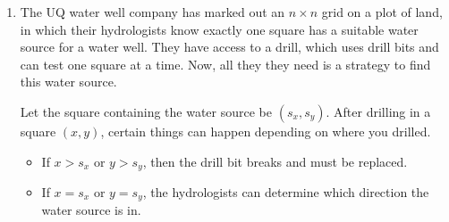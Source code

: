 \documentclass[a4,13pt]{extarticle}
\newenvironment{Solution}{\color{blue}\textbf{Solution:}}{}
\begin{document}
\begin{enumerate}
\begin{enumerate}
	      	\item (1 mark) Using the bound found above, evaluate the overall memory efficiency of your implementation. 
	      	      You should especially consider the case where your plane is very large but has very few elements.
	      	
	      	\begin{Solution}
	      	\end{Solution}
	      	      	      	                      
	      	\item (3 marks) State (using Big-O notation) the time complexity of the following methods:
	      	      	      	                      
	      	      \begin{itemize}
	      	      	\item \texttt{add}
	      	      	\item \texttt{get}
	      	      	\item \texttt{remove}
	      	      	\item \texttt{resize}
	      	      	\item \texttt{clear}
	      	      \end{itemize}
	      	      	      	                      
	      	      Ensure you define all variables used in your bounds, and briefly explain how you came up with the bounds. 
	      	      State any assumptions you made in determining your answers. You should simplify your bounds as much as possible.
	      	      
	      	\begin{Solution}
	      	\end{Solution}
	      \end{enumerate}
	      	              
	      	              
	      \newpage 
	      	
	\item  
	      The UQ water well company has marked out an $n\times n$ grid on a plot of land, in which their hydrologists know exactly 
	      one square has a suitable water source for a water well. They have access to a drill, which uses drill bits and can test one 
	      square at a time. Now, all they they need is a strategy to find this water source.
	      	         
	      Let the square containing the water source be $(s_x,s_y)$. After drilling in a square $(x,y)$, certain things can 
	      happen depending on where you drilled.
	      \begin{itemize}
	      	\item If $x > s_x$ or $y > s_y$, then the drill bit breaks and must be replaced.
	      	\item If $x=s_x$ or $y=s_y$, the hydrologists can determine which direction the water source is in.
	      \end{itemize}
	      	              

\end{enumerate}
\end{document}
